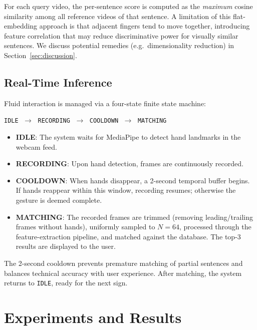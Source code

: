 \documentclass[runningheads]{llncs}
\begin{document}
For each query video, the per-sentence score is computed as the
\emph{maximum} cosine similarity among all reference videos of that
sentence.
A limitation of this flat-embedding approach is that adjacent fingers
tend to move together, introducing feature correlation that may reduce
discriminative power for visually similar sentences.
We discuss potential remedies (e.g.\ dimensionality reduction) in
Section~\ref{sec:discussion}.

\subsection{Real-Time Inference}\label{sec:realtime}

Fluid interaction is managed via a four-state finite state machine:
\begin{center}
\texttt{IDLE} $\;\rightarrow\;$ \texttt{RECORDING} $\;\rightarrow\;$
\texttt{COOLDOWN} $\;\rightarrow\;$ \texttt{MATCHING}
\end{center}

\begin{itemize}
    \item \textbf{IDLE}: The system waits for MediaPipe to detect hand
          landmarks in the webcam feed.
    \item \textbf{RECORDING}: Upon hand detection, frames are
          continuously recorded.
    \item \textbf{COOLDOWN}: When hands disappear, a 2-second temporal
          buffer begins. If hands reappear within this window, recording
          resumes; otherwise the gesture is deemed complete.
    \item \textbf{MATCHING}: The recorded frames are trimmed (removing
          leading/trailing frames without hands), uniformly sampled to
          $N = 64$, processed through the feature-extraction pipeline,
          and matched against the database. The top-3 results are
          displayed to the user.
\end{itemize}

The 2-second cooldown prevents premature matching of partial sentences
and balances technical accuracy with user experience.  
After matching, the system returns to \texttt{IDLE}, ready for the next
sign.

\section{Experiments and Results}\label{sec:experiments}
\end{document}
